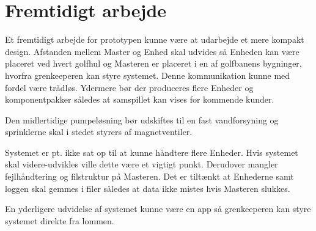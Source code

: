 \chapter{Fremtidigt arbejde}

Et fremtidigt arbejde for prototypen kunne være at udarbejde et mere kompakt design. Afstanden mellem Master og Enhed skal udvides så Enheden kan være placeret ved hvert golfhul og Masteren er placeret i en af golfbanens bygninger, hvorfra grenkeeperen kan styre systemet. Denne kommunikation kunne med fordel være trådløs. Ydermere bør der produceres flere Enheder og komponentpakker således at samspillet kan vises for kommende kunder. 

Den midlertidige pumpeløsning bør udskiftes til en fast vandforsyning og sprinklerne skal i stedet styrers af magnetventiler. 

Systemet er pt. ikke sat op til at kunne håndtere flere Enheder. Hvis systemet skal videre-udvikles ville dette være et vigtigt punkt. Derudover mangler fejlhåndtering og filstruktur på Masteren. Det er tiltænkt at Enhederne samt loggen skal gemmes i filer således at data ikke mistes hvis Masteren slukkes.

En yderligere udvidelse af systemet kunne være en app så grenkeeperen kan styre systemet direkte fra lommen. 
